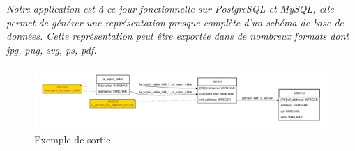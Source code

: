 \textit{Notre application est à ce jour fonctionnelle sur PostgreSQL et MySQL, elle permet de générer une représentation presque complète d'un schéma de base de données. Cette représentation peut être exportée dans de nombreux formats dont jpg, png, svg, ps, pdf.}


\begin{figure}[H]
\centering
\includegraphics[width=\textwidth]{files/exemple_sortie}
\caption{Exemple de sortie.}
\end{figure}